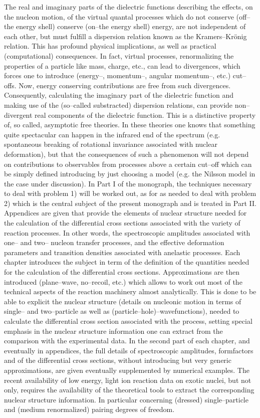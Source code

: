 The real and imaginary parts of the dielectric functions describing the effects, on the nucleon motion, of the virtual quantal processes which do not conserve (off--the energy shell) conserve (on--the energy shell) energy, are not independent of each other, but must fulfill a dispersion relation known as the Kramers--Kr\"{o}nig relation. This has profound physical implications, as well as practical (computational) consequences. In fact, virtual processes, renormalizing the properties of a particle like mass, charge, etc., can lead to divergences, which forces one to introduce (energy--, momentum--, angular momentum--, etc.) cut--offs. Now, energy conserving contributions are free from such divergences. Consequently, calculating the imaginary part of the dielectric function and making use of the (so--called substracted) dispersion relations, can provide non--divergent real components of the dielectric function. This is a distinctive property of, so called, asymptotic free theories. In these theories one knows that something quite spectacular can happen in the infrared end of the spectrum (e.g. spontaneous breaking of rotational invariance associated with nuclear deformation), but that the consequences of such a phenomenon will not depend on contributions to observables from processes above a certain cut--off which can be simply defined introducing by just choosing a model (e.g. the Nilsson model in the case under discussion). In Part I of the monograph, the techniques necessary to deal with problem 1) will be worked out, as for as needed to deal with problem 2) which is the central subject of the present monograph and is treated in Part II. Appendices are given that provide the elements of nuclear structure needed for the calculation of the differential cross sections associated with the variety of reaction processes. In other words, the spectroscopic amplitudes associated with one-- and two-- nucleon transfer processes, and the effective deformation parameters and transition densities associated with anelastic processes. Each chapter introduces the subject in term of the definition of the quantities needed for the calculation of the differential cross sections. Approximations are then introduced (plane--wave, no--recoil, etc.) which allows to work out most of the technical aspects of the reaction machinery almost analytically. This is done to be able to explicit the nuclear structure (details on nucleonic motion in terms of single-- and two--particle as well as (particle--hole)--wavefunctions), needed to calculate the differential cross section associated with the process, setting special emphasis in the nuclear structure information one can extract from the comparison with the experimental data. In the second part of each chapter, and eventually in appendices, the full details of spectroscopic amplitudes, formfactors and of the differential cross sections, without introducing but very generic approximations, are given eventually supplemented by numerical examples. The recent availability of low energy, light ion reaction data on exotic nuclei, but not only, requires the availability of the theoretical tools to extract the corresponding nuclear structure information. In particular concerning (dressed) single--particle and (medium renormalized) pairing degrees of freedom.


